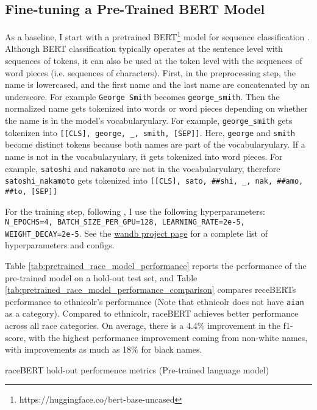 \documentclass[11pt]{article}
\begin{document}
\subsection{Fine-tuning a Pre-Trained BERT Model}

As a baseline, I start with a pretrained BERT\footnote{https://huggingface.co/bert-base-uncased} model for sequence classification \parencite{vaswani_attention_2017,devlin_bert_2019}.
Although BERT classification typically operates at the sentence level with sequences of tokens, it can also be used at the token level with the sequences of word pieces (i.e. sequences of characters).
First, in the preprocessing step, the name is lowercased, and the first name and the last name are concatenated by an underscore.
For example \texttt{George Smith} becomes \texttt{george\_smith}.
Then the normalized name gets tokenized into words or word pieces depending on whether the name is in the model's vocabularyulary. 
For example, \texttt{george\_smith} gets tokenizen into \texttt{{[[CLS], george, \_, smith, [SEP]]}}.
Here, \texttt{george} and \texttt{smith} become distinct tokens because both names are part of the vocabularyulary. 
If a name is not in the vocabularyulary, it gets tokenized into word pieces. 
For example, \texttt{satoshi} and \texttt{nakamoto} are not in the vocabularyulary, therefore \texttt{satoshi\_nakamoto} gets tokenized into \texttt{[[CLS], sato, \#\#shi, \_, nak, \#\#amo, \#\#to, [SEP]]}

For the training step, following \textcite{sun_how_2019}, I use the following hyperparameters: \texttt{N\_EPOCHS=4, BATCH\_SIZE\_PER\_GPU=128, LEARNING\_RATE=2e-5, WEIGHT\_DECAY=2e-5}. 
See the \href{https://wandb.ai/parasu/raceBERT-public/runs/39jr1hrc/overview}{wandb project page} for a complete list of hyperparameters and configs. 

Table \ref{tab:pretrained_race_model_performance} reports the performance of the pre-trained model on a hold-out test set, and Table \ref{tab:pretrained_race_model_performance_comparison} compares receBERTs performance to ethnicolr's performance (Note that ethnicolr does not have \texttt{aian} as a category). 
Compared to ethnicolr, raceBERT achieves better performance across all race categories.
On average, there is a 4.4\% improvement in the f1-score, with the highest performance improvement coming from non-white names, with improvements as much as 18\% for black names.

\begin{table}[H]
 \centering
 
 \caption{raceBERT hold-out performence metrics (Pre-trained language model)}
 \label{tab:pretrained_race_model_performance}
\end{table}
\end{document}
